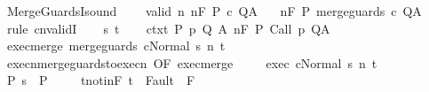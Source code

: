 \begin{isabellebody}
\isamarkupfalse%
%
\endisatagproof
{\isafoldproof}%
%
\isadelimproof
\isanewline
%
\endisadelimproof
\isanewline
{}\isamarkupfalse%
\ MergeGuardsI{\isacharunderscore}sound{\isacharcolon}\ \isanewline
\ \ \ valid{\isacharcolon}\ {\isachardoublequoteopen}{\isasymforall}n{\isachardot}\ {\isasymGamma}{\isacharcomma}{\isasymTheta}{\isasymTurnstile}n{\isacharcolon}\isactrlbsub {\isacharslash}F\isactrlesub \ P\ c\ Q{\isacharcomma}A{\isachardoublequoteclose}\isanewline
\ \ \ {\isachardoublequoteopen}{\isasymGamma}{\isacharcomma}{\isasymTheta}{\isasymTurnstile}n{\isacharcolon}\isactrlbsub {\isacharslash}F\isactrlesub \ P\ merge{\isacharunderscore}guards\ c\ Q{\isacharcomma}A{\isachardoublequoteclose}\isanewline
%
\isadelimproof
%
\endisadelimproof
%
\isatagproof
{}\isamarkupfalse%
\ {\isacharparenleft}rule\ cnvalidI{\isacharparenright}\isanewline
\ \ \isamarkupfalse%
\ s\ t\isanewline
\ \ \isamarkupfalse%
\ ctxt{\isacharcolon}\ {\isachardoublequoteopen}{\isasymforall}{\isacharparenleft}P{\isacharcomma}\ p{\isacharcomma}\ Q{\isacharcomma}\ A{\isacharparenright}{\isasymin}{\isasymTheta}{\isachardot}\ {\isasymGamma}{\isasymTurnstile}n{\isacharcolon}\isactrlbsub {\isacharslash}F\isactrlesub \ P\ {\isacharparenleft}Call\ p{\isacharparenright}\ Q{\isacharcomma}A{\isachardoublequoteclose}\ \isanewline
\ \ \isamarkupfalse%
\ exec{\isacharunderscore}merge{\isacharcolon}\ {\isachardoublequoteopen}{\isasymGamma}{\isasymturnstile}{\isasymlangle}merge{\isacharunderscore}guards\ c{\isacharcomma}Normal\ s{\isasymrangle}\ {\isacharequal}n{\isasymRightarrow}\ t{\isachardoublequoteclose}\isanewline
\ \ \isamarkupfalse%
\ execn{\isacharunderscore}merge{\isacharunderscore}guards{\isacharunderscore}to{\isacharunderscore}execn\ {\isacharbrackleft}OF\ exec{\isacharunderscore}merge{\isacharbrackright}\ \isanewline
\ \ \isamarkupfalse%
\ exec{\isacharcolon}\ {\isachardoublequoteopen}{\isasymGamma}{\isasymturnstile}{\isasymlangle}c{\isacharcomma}Normal\ s{\isasymrangle}\ {\isacharequal}n{\isasymRightarrow}\ t{\isachardoublequoteclose}\ \isacommand{{\isachardot}}\isamarkupfalse%
\isanewline
\ \ \isamarkupfalse%
\ P{\isacharcolon}\ {\isachardoublequoteopen}s\ {\isasymin}\ P{\isachardoublequoteclose}\ \isanewline
\ \ \isamarkupfalse%
\ t{\isacharunderscore}notin{\isacharunderscore}F{\isacharcolon}\ {\isachardoublequoteopen}t\ {\isasymnotin}\ Fault\ {\isacharbackquote}\ F{\isachardoublequoteclose}\isanewline

\end{isabellebody}
